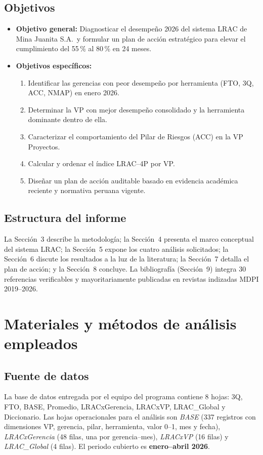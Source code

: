 \documentclass[12pt,a4paper]{article}
\begin{document}
\subsection{Objetivos}
\begin{itemize}
\item \textbf{Objetivo general:} Diagnosticar el desempeño 2026 del sistema LRAC de Mina Juanita S.A.\ y formular un plan de acción estratégico para elevar el cumplimiento del 55\,\% al 80\,\% en 24 meses.
\item \textbf{Objetivos específicos:}
  \begin{enumerate}
  \item Identificar las gerencias con peor desempeño por herramienta (FTO, 3Q, ACC, NMAP) en enero 2026.
  \item Determinar la VP con mejor desempeño consolidado y la herramienta dominante dentro de ella.
  \item Caracterizar el comportamiento del Pilar de Riesgos (ACC) en la VP Proyectos.
  \item Calcular y ordenar el índice LRAC--4P por VP.
  \item Diseñar un plan de acción auditable basado en evidencia académica reciente y normativa peruana vigente.
  \end{enumerate}
\end{itemize}

\subsection{Estructura del informe}
La Sección~3 describe la metodología; la Sección~4 presenta el marco conceptual del sistema LRAC; la Sección~5 expone los cuatro análisis solicitados; la Sección~6 discute los resultados a la luz de la literatura; la Sección~7 detalla el plan de acción; y la Sección~8 concluye. La bibliografía (Sección~9) integra 30 referencias verificables y mayoritariamente publicadas en revistas indizadas MDPI 2019--2026.

\section{Materiales y métodos de análisis empleados}

\subsection{Fuente de datos}
La base de datos entregada por el equipo del programa contiene 8 hojas:
3Q, FTO, BASE, Promedio, LRACxGerencia, LRACxVP, LRAC\_Global y Diccionario.
Las hojas operacionales para el análisis son \emph{BASE} (337 registros con dimensiones VP, gerencia, pilar, herramienta, valor 0--1, mes y fecha), \emph{LRACxGerencia} (48 filas, una por gerencia--mes), \emph{LRACxVP} (16 filas) y \emph{LRAC\_Global} (4 filas). El periodo cubierto es \textbf{enero--abril 2026}.
\end{document}
